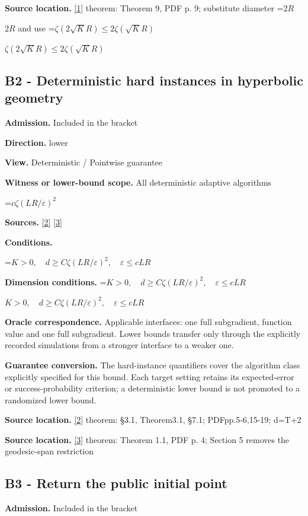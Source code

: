 \documentclass[10pt,a4paper]{article}
\newcommand{\AtlasMath}[1]{\par\begingroup\centering\setbox0=\hbox{$\displaystyle #1$}\ifdim\wd0>1.4\linewidth\typeout{ATLAS WIDE FORMULA: \the\wd0}\fi\ifdim\wd0>\linewidth\resizebox{\linewidth}{!}{\box0}\else\box0\fi\par\endgroup}
\newcommand{\AtlasInlineMath}[1]{\begingroup\setbox0=\hbox{$#1$}\ifdim\wd0>.4\linewidth\endgroup\AtlasMath{#1}\else\endgroup$#1$\fi}
\begin{document}
\textbf{Source location.} \href{https://proceedings.mlr.press/v49/zhang16b.pdf}{[1]} theorem: Theorem 9, PDF p. 9; substitute diameter \AtlasInlineMath{2R} and use \AtlasInlineMath{\zeta(2\sqrt K R)\le2\zeta(\sqrt K R)}

\subsection{B2 - Deterministic hard instances in hyperbolic geometry}
\textbf{Admission.} Included in the bracket

\textbf{Direction.} lower

\textbf{View.} Deterministic / Pointwise guarantee

\textbf{Witness or lower-bound scope.} All deterministic adaptive algorithms

\AtlasMath{c\zeta(LR/\varepsilon)^2}
\textbf{Sources.} \href{https://arxiv.org/pdf/2610.12184v3}{[2]} \href{https://arxiv.org/pdf/2610.26815v1}{[3]}

\textbf{Conditions.} 
\AtlasMath{K>0,\quad d\ge C\zeta(LR/\varepsilon)^2,\quad\varepsilon\le cLR}


\textbf{Dimension conditions.} \AtlasInlineMath{K>0,\quad d\ge C\zeta(LR/\varepsilon)^2,\quad\varepsilon\le cLR}

\textbf{Oracle correspondence.} Applicable interfaces: one full subgradient, function value and one full subgradient. Lower bounds transfer only through the explicitly recorded simulations from a stronger interface to a weaker one.

\textbf{Guarantee conversion.} The hard-instance quantifiers cover the algorithm class explicitly specified for this bound. Each target setting retains its expected-error or success-probability criterion; a deterministic lower bound is not promoted to a randomized lower bound.

\textbf{Source location.} \href{https://arxiv.org/pdf/2610.12184v3}{[2]} theorem: §3.1, Theorem3.1, §7.1; PDFpp.5-6,15-19; d=T+2

\textbf{Source location.} \href{https://arxiv.org/pdf/2610.26815v1}{[3]} theorem: Theorem 1.1, PDF p. 4; Section 5 removes the geodesic-span restriction

\subsection{B3 - Return the public initial point}
\textbf{Admission.} Included in the bracket
\end{document}

